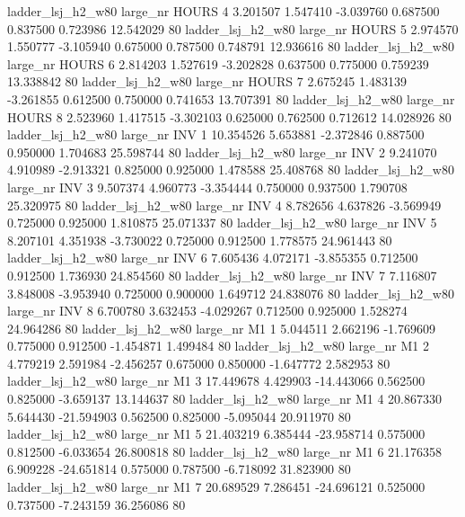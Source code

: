   ladder_lsj_h2_w80   large_nr    HOURS                 4  3.201507  1.547410  -3.039760 0.687500 0.837500  0.723986   12.542029 80
  ladder_lsj_h2_w80   large_nr    HOURS                 5  2.974570  1.550777  -3.105940 0.675000 0.787500  0.748791   12.936616 80
  ladder_lsj_h2_w80   large_nr    HOURS                 6  2.814203  1.527619  -3.202828 0.637500 0.775000  0.759239   13.338842 80
  ladder_lsj_h2_w80   large_nr    HOURS                 7  2.675245  1.483139  -3.261855 0.612500 0.750000  0.741653   13.707391 80
  ladder_lsj_h2_w80   large_nr    HOURS                 8  2.523960  1.417515  -3.302103 0.625000 0.762500  0.712612   14.028926 80
  ladder_lsj_h2_w80   large_nr      INV                 1 10.354526  5.653881  -2.372846 0.887500 0.950000  1.704683   25.598744 80
  ladder_lsj_h2_w80   large_nr      INV                 2  9.241070  4.910989  -2.913321 0.825000 0.925000  1.478588   25.408768 80
  ladder_lsj_h2_w80   large_nr      INV                 3  9.507374  4.960773  -3.354444 0.750000 0.937500  1.790708   25.320975 80
  ladder_lsj_h2_w80   large_nr      INV                 4  8.782656  4.637826  -3.569949 0.725000 0.925000  1.810875   25.071337 80
  ladder_lsj_h2_w80   large_nr      INV                 5  8.207101  4.351938  -3.730022 0.725000 0.912500  1.778575   24.961443 80
  ladder_lsj_h2_w80   large_nr      INV                 6  7.605436  4.072171  -3.855355 0.712500 0.912500  1.736930   24.854560 80
  ladder_lsj_h2_w80   large_nr      INV                 7  7.116807  3.848008  -3.953940 0.725000 0.900000  1.649712   24.838076 80
  ladder_lsj_h2_w80   large_nr      INV                 8  6.700780  3.632453  -4.029267 0.712500 0.925000  1.528274   24.964286 80
  ladder_lsj_h2_w80   large_nr       M1                 1  5.044511  2.662196  -1.769609 0.775000 0.912500 -1.454871    1.499484 80
  ladder_lsj_h2_w80   large_nr       M1                 2  4.779219  2.591984  -2.456257 0.675000 0.850000 -1.647772    2.582953 80
  ladder_lsj_h2_w80   large_nr       M1                 3 17.449678  4.429903 -14.443066 0.562500 0.825000 -3.659137   13.144637 80
  ladder_lsj_h2_w80   large_nr       M1                 4 20.867330  5.644430 -21.594903 0.562500 0.825000 -5.095044   20.911970 80
  ladder_lsj_h2_w80   large_nr       M1                 5 21.403219  6.385444 -23.958714 0.575000 0.812500 -6.033654   26.800818 80
  ladder_lsj_h2_w80   large_nr       M1                 6 21.176358  6.909228 -24.651814 0.575000 0.787500 -6.718092   31.823900 80
  ladder_lsj_h2_w80   large_nr       M1                 7 20.689529  7.286451 -24.696121 0.525000 0.737500 -7.243159   36.256086 80
